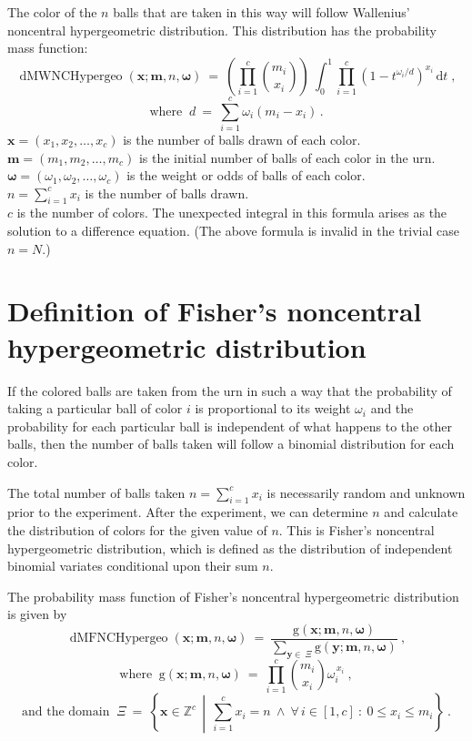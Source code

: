 \documentclass[a4paper]{article}
\begin{document}
The color of the $n$ balls that are taken in this way will follow Wallenius'
noncentral hypergeometric distribution. This distribution has the 
probability mass function:
%
$$
\operatorname{dMWNCHypergeo}(\boldsymbol{x};\boldsymbol{m},n,\boldsymbol{\omega}) 
\:=\: 
\left( \prod_{i=1}^c \binom{m_i}{x_i} \right)
\: \int_0^1 \prod_{i=1}^c
(1-t^{{\omega_i}/{d}})^{x_i} \, \mathrm{d}t \;,
$$
%
$$
\text{where } \: d \:=\:
\sum_{i=1}^c \omega_i(m_i-x_i) \,.
$$
%
$\boldsymbol{x}=(x_1,x_2,\ldots,x_c)$ 
is the number of balls drawn of each color.\\
$\boldsymbol{m}=(m_1,m_2,\ldots,m_c)$ 
is the initial number of balls of each color in the urn.\\
$\boldsymbol{\omega}=(\omega_1,\omega_2,\ldots,\omega_c)$
is the weight or odds of balls of each color.\\
$n = \sum_{i=1}^c x_i$ is the number of balls drawn.\\
$c$ is the number of colors. The unexpected integral in this 
formula arises as the solution to a difference equation.
(The above formula is invalid in the trivial case $n = N$.)


\section{Definition of Fisher's noncentral hypergeometric distribution}
%
If the colored balls are taken from the urn in such a way that 
the probability of taking a particular ball of color $i$ is 
proportional to its weight $\omega_i$ and the probability for
each particular ball is independent of what happens to the 
other balls, then the number of balls taken will follow a
binomial distribution for each color.

The total number of balls taken $n = \sum_{i=1}^c x_i$ is
necessarily random and unknown prior to the experiment.
After the experiment, we can determine $n$ and calculate the
distribution of colors for the given value of $n$.
This is Fisher's noncentral hypergeometric distribution, which
is defined as the distribution of independent binomial variates
conditional upon their sum $n$.

The probability mass function of Fisher's noncentral hypergeometric 
distribution is given by
%
$$
\operatorname{dMFNCHypergeo}(\boldsymbol{x};\boldsymbol{m},n,\boldsymbol{\omega})
\:=\:
\frac{\textrm{g}(\boldsymbol{x};\boldsymbol{m},n,\boldsymbol{\omega})}
{\sum\limits_{\boldsymbol{y}\in \: \Xi}
\textrm{g}(\boldsymbol{y};\boldsymbol{m},n,\boldsymbol{\omega})}\:,
$$
%
$$
\text{where } \: \textrm{g}(\boldsymbol{x};\boldsymbol{m},n,\boldsymbol{\omega})
\:=\: \prod_{i=1}^c
\binom{m_i}{x_i}\omega_i^{\,x_i}\:,
$$
%
$$
\text{and the domain }\: \Xi \:=\: \left\{\boldsymbol{x}\in\mathbb{Z}^c \,\middle|\,
\sum_{i=1}^c x_i = n \: \wedge \: 
\forall\, i \in [1,c] \: : \: 0 \leq x_i \leq m_i \right\}\:.
$$
\end{document}
